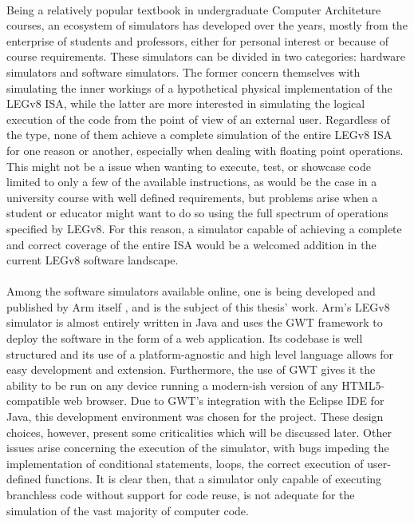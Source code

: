 \paragraph{}
Being a relatively popular textbook in undergraduate Computer Architeture courses, an ecosystem of simulators has developed over the years, mostly from the enterprise of students and professors, either for personal interest or because of course requirements. These simulators can be divided in two categories: hardware simulators and software simulators. The former concern themselves with simulating the inner workings of a hypothetical physical implementation of the LEGv8 ISA, while the latter are more interested in simulating the logical execution of the code from the point of view of an external user. Regardless of the type, none of them achieve a complete simulation of the entire LEGv8 ISA for one reason or another, especially when dealing with floating point operations. This might not be a issue when wanting to execute, test, or showcase code limited to only a few of the available instructions, as would be the case in a university course with well defined requirements, but problems arise when a student or educator might want to do so using the full spectrum of operations specified by LEGv8. For this reason, a simulator capable of achieving a complete and correct coverage of the entire ISA would be a welcomed addition in the current LEGv8 software landscape.

\paragraph{}
Among the software simulators available online, one is being developed and published by Arm itself \cite{legv8simARMrepo}, and is the subject of this thesis' work.
Arm's LEGv8 simulator is almost entirely written in Java and uses the GWT framework \cite{gwtweb} to deploy the software in the form of a web application. Its codebase is well structured and its use of a platform-agnostic and high level language allows for easy development and extension. Furthermore, the use of GWT gives it the ability to be run on any device running a modern-ish version of any HTML5-compatible web browser. Due to GWT's integration with the Eclipse IDE for Java, this development environment was chosen for the project. These design choices, however, present some criticalities which will be discussed later.
Other issues arise concerning the execution of the simulator, with bugs impeding the implementation of conditional statements, loops, the correct execution of user-defined functions. It is clear then, that a simulator only capable of executing branchless code without support for code reuse, is not adequate for the simulation of the vast majority of computer code.
